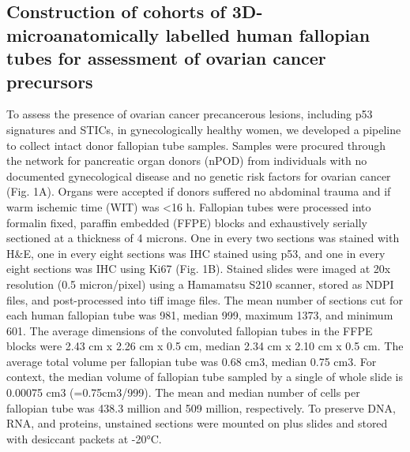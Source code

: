 \begin{refsection}
    \subsection{Construction of cohorts of 3D-microanatomically labelled human fallopian tubes for assessment of ovarian cancer precursors }
    To assess the presence of ovarian cancer precancerous lesions, including p53 signatures and STICs, in gynecologically healthy women, we developed a pipeline to collect intact donor fallopian tube samples. Samples were procured through the network for pancreatic organ donors (nPOD) from individuals with no documented gynecological disease and no genetic risk factors for ovarian cancer (Fig. 1A). Organs were accepted if donors suffered no abdominal trauma and if warm ischemic time (WIT) was <16 h.
    Fallopian tubes were processed into formalin fixed, paraffin embedded (FFPE) blocks and exhaustively serially sectioned at a thickness of 4 microns. One in every two sections was stained with H\&E, one in every eight sections was IHC stained using p53, and one in every eight sections was IHC using Ki67 (Fig. 1B). Stained slides were imaged at 20x resolution (0.5 micron/pixel) using a Hamamatsu S210 scanner, stored as NDPI files, and post-processed into tiff image files. The mean number of sections cut for each human fallopian tube was 981, median 999, maximum 1373, and minimum 601. The average dimensions of the convoluted fallopian tubes in the FFPE blocks were 2.43 cm x 2.26 cm x 0.5 cm, median 2.34 cm x 2.10 cm x 0.5 cm. The average total volume per fallopian tube was 0.68 cm3, median 0.75 cm3. For context, the median volume of fallopian tube sampled by a single of whole slide is 0.00075 cm3 (=0.75cm3/999). The mean and median number of cells per fallopian tube was 438.3 million and 509 million, respectively. To preserve DNA, RNA, and proteins, unstained sections were mounted on plus slides and stored with desiccant packets at -20°C. 

\end{refsection}
